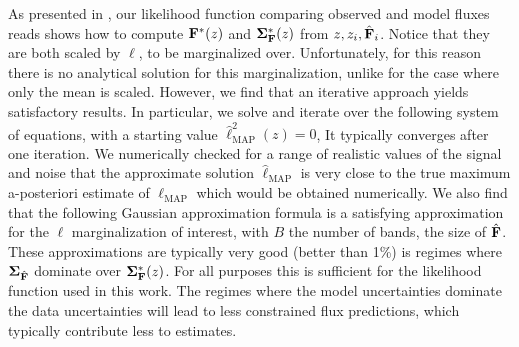 \documentclass[aps,prd,showpacs,superscriptaddress,groupedaddress]{revtex4}  %
\begin{document}
As presented in , our likelihood function comparing observed and model fluxes reads
 shows how to compute $ \mat{F}^*(z)$ and $\mat{\Sigma^*_{{\mat{F}}}}(z)$ from $z, z_i, \hat{\mat{F}}_i$.
Notice that they are both scaled by $\ell$, to be marginalized over. 
Unfortunately, for this reason there is no analytical solution for this marginalization, unlike for the case where only the mean is scaled.
However, we find that an iterative approach yields satisfactory results.
In particular, we solve and iterate over the following system of equations, with a starting value $\hat{\ell}^2_\mathrm{MAP}(z)  = 0$,
It typically converges after one iteration. 
We numerically checked for a range of realistic values of the signal and noise that the approximate solution $\hat{\ell}_\mathrm{MAP}$ is very close to the true maximum a-posteriori estimate of $\ell_\mathrm{MAP}$ which would be obtained numerically. 
We also find that the following Gaussian approximation formula is a satisfying approximation for the $\ell$ marginalization of interest,
with $B$ the number of bands, \ie the size of $\hat{\mat{F}}$.
These approximations are typically very good (better than 1\%) is regimes where $\mat{\Sigma}_{\hat{\mat{F}}}$ dominate over $\mat{\Sigma^*_{{\mat{F}}}}(z)$. 
For all purposes this is sufficient for the likelihood function used in this work. 
The regimes where the model uncertainties dominate the data uncertainties will lead to less constrained flux predictions, which typically contribute less to \photoz estimates. 
\end{document}

